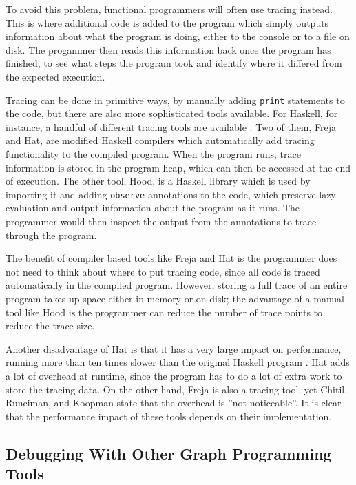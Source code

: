 \documentclass[authoryearcitations]{UoYCSproject}
\begin{document}
To avoid this problem, functional programmers will often use tracing instead.
This is where additional code is added to the program which simply outputs
information about what the program is doing, either to the console or to a file on
disk. The progammer then reads this information back once the program has finished,
to see what steps the program took and identify where it differed from the
expected execution.

Tracing can be done in primitive ways, by manually adding \texttt{print}
statements to the code, but there are also more sophisticated tools available.
For Haskell, for instance, a handful of different tracing tools are
available \citep{runciman2000}. Two of them, Freja and Hat, are modified Haskell
compilers which automatically add tracing functionality to the compiled program. When
the program runs, trace information is stored in the program heap, which can then
be accessed at the end of execution. The other tool, Hood, is a Haskell library
which is used by importing it and adding \texttt{observe} annotations to the code,
which preserve lazy evaluation and output information about the program as it runs.
The programmer would then inspect the output from the annotations to trace through
the program.

The benefit of compiler based tools like Freja and Hat is the programmer does not
need to think about where to put tracing code, since all code is traced automatically
in the compiled program. However, storing a full trace of an entire program takes
up space either in memory or on disk; the advantage of a manual tool like Hood is
the programmer can reduce the number of trace points to reduce the trace size.

Another disadvantage of Hat is that it has a very large impact on performance,
running more than ten times slower than the original Haskell program \citep{runciman2000}.
Hat adds a lot of overhead at runtime, since the program has to do a lot of
extra work to store the tracing data. On the other hand, Freja is also a tracing
tool, yet Chitil, Runciman, and Koopman state that the overhead is ''not
noticeable''. It is clear that the performance impact of these tools depends on
their implementation.


\subsection{Debugging With Other Graph Programming Tools}
\label{sec:DebuggingOtherGraphProgrammingTools}
\end{document}
